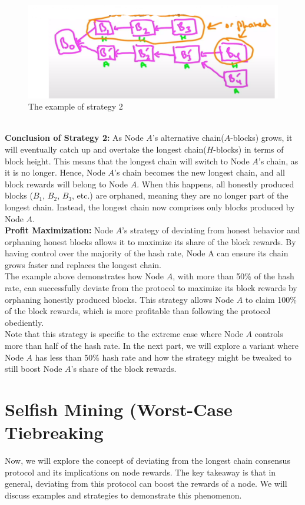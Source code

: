 \begin{figure}[h]
    \centering
    \includegraphics[scale = 0.5]{figures/f41.png}
    \caption{The example of strategy 2}
    \label{fig:mesh1}
\end{figure}\\

\noindent
\textbf{Conclusion of Strategy 2: }
As Node $A$'s alternative chain($A$-blocks) grows, it will eventually catch up and overtake the longest chain($H$-blocks) in terms of block height. This means that the longest chain will switch to Node $A$'s chain, as it is no longer. Hence, Node $A$'s chain becomes the new longest chain, and all block rewards will belong to Node $A$. When this happens, all honestly produced blocks ($B_1$, $B_2$, $B_3$, etc.) are orphaned, meaning they are no longer part of the longest chain. Instead, the longest chain now comprises only blocks produced by Node $A$.\\

\noindent
\textbf{Profit Maximization:} Node $A$'s strategy of deviating from honest behavior and orphaning honest blocks allows it to maximize its share of the block rewards. By having control over the majority of the hash rate, Node A can ensure its chain grows faster and replaces the longest chain.\\
The example above demonstrates how Node $A$, with more than 50\% of the hash rate, can successfully deviate from the protocol to maximize its block rewards by orphaning honestly produced blocks. This strategy allows Node $A$ to claim 100\% of the block rewards, which is more profitable than following the protocol obediently.\\
Note that this strategy is specific to the extreme case where Node $A$ controls more than half of the hash rate. In the next part, we will explore a variant where Node $A$ has less than 50\% hash rate and how the strategy might be tweaked to still boost Node $A$'s share of the block rewards.


\section{Selfish Mining (Worst-Case Tiebreaking}
Now, we will explore the concept of deviating from the longest chain consensus protocol and its implications on node rewards. The key takeaway is that in general, deviating from this protocol can boost the rewards of a node. We will discuss examples and strategies to demonstrate this phenomenon.

